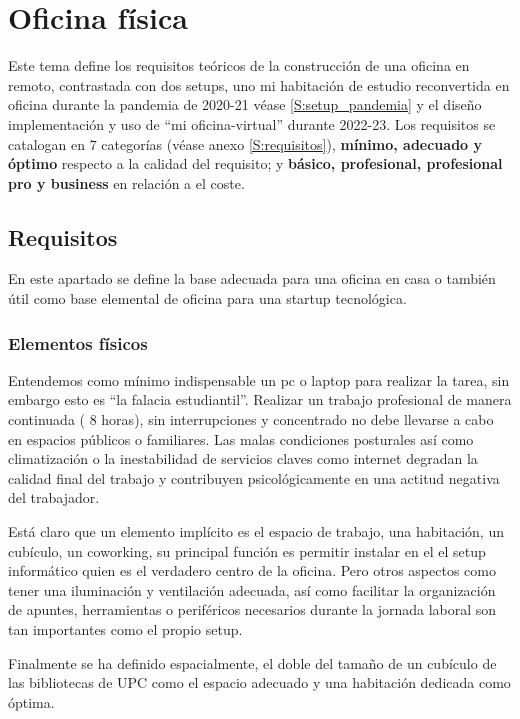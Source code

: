 \chapter{Oficina física}\label{S:tema_1}
Este tema define los requisitos teóricos de la construcción de una oficina en remoto, contrastada con dos setups, uno mi habitación de estudio reconvertida en oficina durante la pandemia de 2020-21 véase \ref{S:setup_pandemia} y el diseño implementación y uso de “mi oficina-virtual” durante 2022-23. Los requisitos se catalogan en 7 categorías (véase anexo \ref{S:requisitos}), \textbf{mínimo, adecuado y óptimo} respecto a la calidad del requisito; y \textbf{básico, profesional, profesional pro y business} en relación a el coste.


\section{Requisitos}
En este apartado se define la base adecuada para una oficina en casa o también útil como base elemental de oficina para una startup tecnológica.

\subsection{Elementos físicos}
Entendemos como mínimo indispensable un pc o laptop para realizar la tarea, sin embargo esto es “la falacia estudiantil”. Realizar un trabajo profesional de manera continuada ( 8 horas), sin interrupciones y concentrado no debe llevarse a cabo en espacios públicos o familiares. Las malas condiciones posturales así como climatización o la inestabilidad de servicios claves como internet degradan la calidad final del trabajo\cite{c_postura} y contribuyen psicológicamente en una actitud negativa del trabajador\cite{c_postura_covid}.

 Está claro que un elemento implícito es el espacio de trabajo, una habitación, un cubículo, un coworking, su principal función es permitir instalar en el el setup informático quien es el verdadero centro de la oficina. Pero otros aspectos como tener una iluminación y ventilación adecuada, así como facilitar la organización de apuntes, herramientas o periféricos necesarios durante la jornada laboral son tan importantes como el propio setup.

Finalmente se ha definido espacialmente, el doble del tamaño de un cubículo de las bibliotecas de UPC como el espacio adecuado y una habitación dedicada como óptima. 

